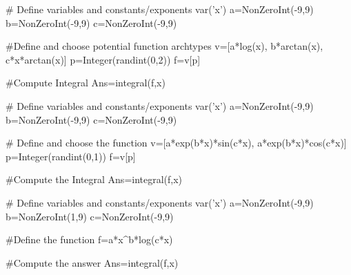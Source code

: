 \begin{sagesilent}
# Define variables and constants/exponents
var('x')
a=NonZeroInt(-9,9)
b=NonZeroInt(-9,9)
c=NonZeroInt(-9,9)

#Define and choose potential function archtypes
v=[a*log(x), b*arctan(x), c*x*arctan(x)]
p=Integer(randint(0,2))
f=v[p]

#Compute Integral
Ans=integral(f,x)
\end{sagesilent}


\begin{sagesilent}
# Define variables and constants/exponents
var('x')
a=NonZeroInt(-9,9)
b=NonZeroInt(-9,9)
c=NonZeroInt(-9,9)

# Define and choose the function
v=[a*exp(b*x)*sin(c*x), a*exp(b*x)*cos(c*x)]
p=Integer(randint(0,1))
f=v[p]

#Compute the Integral
Ans=integral(f,x)
\end{sagesilent}



\begin{sagesilent}
# Define variables and constants/exponents
var('x')
a=NonZeroInt(-9,9)
b=NonZeroInt(1,9)
c=NonZeroInt(-9,9)

#Define the function
f=a*x^b*log(c*x)

#Compute the answer
Ans=integral(f,x)
\end{sagesilent}

